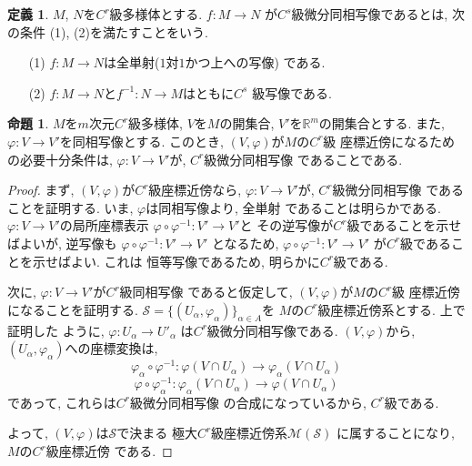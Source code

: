 \documentclass[a4j,12pt]{jarticle}
\theoremstyle{definition}
\newtheorem{definition}[theorem]{定義}
\newtheorem{proposition}[theorem]{命題}
\begin{document}
\begin{definition}\label{def:C^s deffeomorphism}
    $M$, $N$を$C^r$級多様体とする. $f:M\to N$
    が$C^s$級微分同相写像であるとは, 次の条件
    (1), (2)を満たすことをいう. 
    \begin{itemize}
        \item[(1)]
        $f:M\to N$は全単射($1$対$1$かつ上への写像)
        である. 
        \item[(2)] 
        $f:M\to N$と$f^{-1}:N\to M$はともに$C^s$
        級写像である. 
    \end{itemize}
\end{definition}
\begin{proposition}\label{prop: cord-nabor condition}
    $M$を$m$次元$C^r$級多様体, $V$を$M$の開集合, 
    $V'$を$\mathbb{R}^m$の開集合とする. また, 
    $\varphi:V\to V'$を同相写像とする. 
    このとき, $(V,\varphi)$が$M$の$C^r$級
    座標近傍になるための必要十分条件は, 
    $\varphi:V\to V'$が, $C^r$級微分同相写像
    であることである. 
\end{proposition}
\begin{proof}
    まず, $(V,\varphi)$が$C^r$級座標近傍なら, 
    $\varphi:V\to V'$が, $C^r$級微分同相写像
    であることを証明する. 
    いま, $\varphi$は同相写像より, 全単射
    であることは明らかである. 
    $\varphi:V\to V'$の局所座標表示
    $\varphi \circ\varphi^{-1}:V'\to V'$と
    その逆写像が$C^r$級であることを示せばよいが, 
    逆写像も
    $\varphi \circ\varphi^{-1}:V'\to V'$
    となるため, 
    $\varphi \circ\varphi^{-1}:V'\to V'$
    が$C^r$級であることを示せばよい. これは
    恒等写像であるため, 明らかに$C^r$級である. 

    次に, $\varphi:V\to V'$が$C^r$級同相写像
    であると仮定して, $(V,\varphi)$が$M$の$C^r$級
    座標近傍になることを証明する. 
    $\mathcal{S}=\{(U_\alpha,
    \varphi_\alpha)\}_{\alpha\in A}$を
    $M$の$C^r$級座標近傍系とする. 上で証明した
    ように, $\varphi:U_\alpha\to U'_\alpha$
    は$C^r$級微分同相写像である. 
    $(V,\varphi)$から, $(U_\alpha,
    \varphi_\alpha)$への座標変換は, 
    $$\varphi_\alpha \circ \varphi^{-1}:
    \varphi(V\cap U_\alpha)\to 
    \varphi_\alpha(V\cap U_\alpha)$$
    $$\varphi \circ \varphi_\alpha^{-1}:
    \varphi_\alpha(V\cap U_\alpha)\to 
    \varphi(V\cap U_\alpha)$$
    であって, これらは$C^r$級微分同相写像
    の合成になっているから, $C^r$級である. 

    よって, $(V,\varphi)$は$\mathcal{S}$で決まる
    極大$C^r$級座標近傍系$\mathcal{M}(\mathcal{S})$
    に属することになり, $M$の$C^r$級座標近傍
    である. 
\end{proof}
%
\newpage
\end{document}
